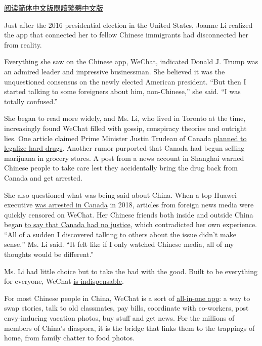 \href{https://cn.nytimes3xbfgragh.onion/technology/20200907/wechat-china-united-states/}{阅读简体中文版}\href{https://cn.nytimes3xbfgragh.onion/technology/20200907/wechat-china-united-states/zh-hant/}{閱讀繁體中文版}

Just after the 2016 presidential election in the United States, Joanne
Li realized the app that connected her to fellow Chinese immigrants had
disconnected her from reality.

Everything she saw on the Chinese app, WeChat, indicated Donald J. Trump
was an admired leader and impressive businessman. She believed it was
the unquestioned consensus on the newly elected American president.
``But then I started talking to some foreigners about him,
non-Chinese,'' she said. ``I was totally confused.''

She began to read more widely, and Ms. Li, who lived in Toronto at the
time, increasingly found WeChat filled with gossip, conspiracy theories
and outright lies. One article claimed Prime Minister Justin Trudeau of
Canada
\href{https://thetyee.ca/News/2020/08/26/Conservative-WeChat-Ad-Trudeau/}{planned
to legalize hard drugs}. Another rumor purported that Canada had begun
selling marijuana in grocery stores. A post from a news account in
Shanghai warned Chinese people to take care lest they accidentally bring
the drug back from Canada and get arrested.

She also questioned what was being said about China. When a top Huawei
executive
\href{https://www.nytimes3xbfgragh.onion/2018/12/05/business/huawei-cfo-arrest-canada-extradition.html}{was
arrested in Canada} in 2018, articles from foreign news media were
quickly censored on WeChat. Her Chinese friends both inside and outside
China began
\href{https://www.nytimes3xbfgragh.onion/2018/12/07/world/asia/huawei-arrest-china.html}{to
say that Canada had no justice}, which contradicted her own experience.
``All of a sudden I discovered talking to others about the issue didn't
make sense,'' Ms. Li said. ``It felt like if I only watched Chinese
media, all of my thoughts would be different.''

Ms. Li had little choice but to take the bad with the good. Built to be
everything for everyone, WeChat
\href{https://www.nytimes3xbfgragh.onion/video/technology/100000004574648/china-internet-wechat.html}{is
indispensable}.

For most Chinese people in China, WeChat is a sort of
\href{https://www.nytimes3xbfgragh.onion/2017/07/16/business/china-cash-smartphone-payments.html}{all-in-one
app}: a way to swap stories, talk to old classmates, pay bills,
coordinate with co-workers, post envy-inducing vacation photos, buy
stuff and get news. For the millions of members of China's diaspora, it
is the bridge that links them to the trappings of home, from family
chatter to food photos.


